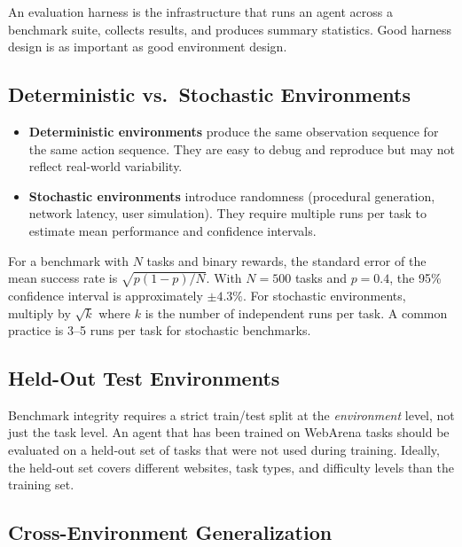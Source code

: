 An evaluation harness is the infrastructure that runs an agent across a benchmark suite, collects results, and produces summary statistics. Good harness design is as important as good environment design.

\subsection{Deterministic vs.~Stochastic Environments}
\label{deterministic-vs.-stochastic-environments}

\begin{itemize}
  \item \textbf{Deterministic environments} produce the same observation sequence for the same action sequence. They are easy to debug and reproduce but may not reflect real-world variability.
  \item \textbf{Stochastic environments} introduce randomness (procedural generation, network latency, user simulation). They require multiple runs per task to estimate mean performance and confidence intervals.
\end{itemize}

\begin{questionbox}
For a benchmark with $N$ tasks and binary rewards, the standard error of the mean success rate is $\sqrt{p(1-p)/N}$. With $N=500$ tasks and $p=0.4$, the 95\% confidence interval is approximately $\pm 4.3\%$. For stochastic environments, multiply by $\sqrt{k}$ where $k$ is the number of independent runs per task. A common practice is 3--5 runs per task for stochastic benchmarks.
\end{questionbox}

\subsection{Held-Out Test Environments}
\label{held-out-test-environments}

Benchmark integrity requires a strict train/test split at the \emph{environment} level, not just the task level. An agent that has been trained on WebArena tasks should be evaluated on a held-out set of tasks that were not used during training. Ideally, the held-out set covers different websites, task types, and difficulty levels than the training set.

\subsection{Cross-Environment Generalization}
\label{cross-environment-generalization}

